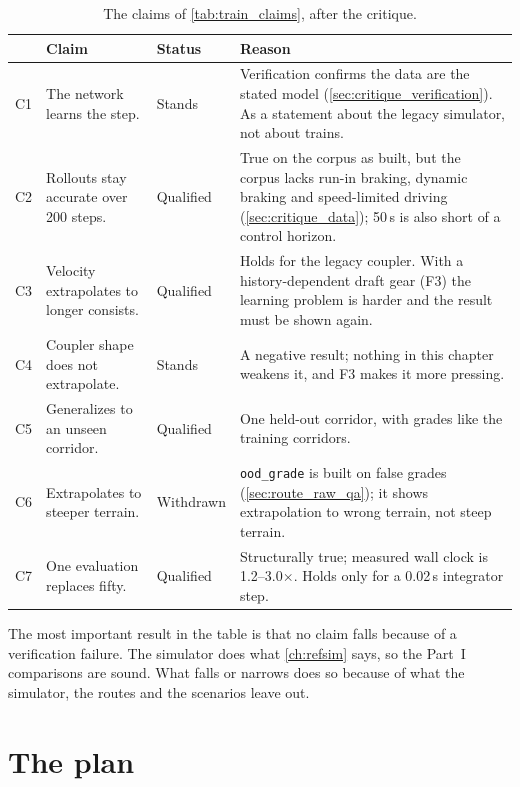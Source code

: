 \begin{table}[htbp]
    \centering
    \small
    \begin{tabular}{>{\raggedright}p{0.6cm}>{\raggedright}p{4.0cm}>{\raggedright}p{1.9cm}>{\raggedright\arraybackslash}p{6.6cm}}
        \toprule
        & Claim & Status & Reason \\
        \midrule
        C1 & The network learns the step. & Stands & Verification confirms the data are the stated model (\cref{sec:critique_verification}). As a statement about the legacy simulator, not about trains. \\
        C2 & Rollouts stay accurate over 200 steps. & Qualified & True on the corpus as built, but the corpus lacks run-in braking, dynamic braking and speed-limited driving (\cref{sec:critique_data}); 50\,s is also short of a control horizon. \\
        C3 & Velocity extrapolates to longer consists. & Qualified & Holds for the legacy coupler. With a history-dependent draft gear (F3) the learning problem is harder and the result must be shown again. \\
        C4 & Coupler shape does not extrapolate. & Stands & A negative result; nothing in this chapter weakens it, and F3 makes it more pressing. \\
        C5 & Generalizes to an unseen corridor. & Qualified & One held-out corridor, with grades like the training corridors. \\
        C6 & Extrapolates to steeper terrain. & Withdrawn & \texttt{ood\_grade} is built on false grades (\cref{sec:route_raw_qa}); it shows extrapolation to wrong terrain, not steep terrain. \\
        C7 & One evaluation replaces fifty. & Qualified & Structurally true; measured wall clock is 1.2--3.0$\times$. Holds only for a 0.02\,s integrator step. \\
        \bottomrule
    \end{tabular}
    \caption{The claims of \cref{tab:train_claims}, after the critique.}
    \label{tab:critique_claims}
\end{table}

The most important result in the table is that no claim falls because of a verification failure. The simulator does what \cref{ch:refsim} says, so the Part~I comparisons are sound. What falls or narrows does so because of what the simulator, the routes and the scenarios leave out.

\section{The plan}
\label{sec:critique_plan}

